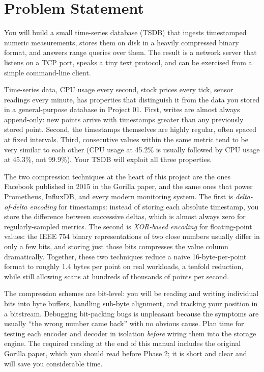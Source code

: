 \documentclass[11pt,a4paper]{article}
\begin{document}

\section{Problem Statement}

You will build a small time-series database (TSDB) that ingests timestamped numeric measurements, stores them on disk in a heavily compressed binary format, and answers range queries over them. The result is a network server that listens on a TCP port, speaks a tiny text protocol, and can be exercised from a simple command-line client.

Time-series data, CPU usage every second, stock prices every tick, sensor readings every minute, has properties that distinguish it from the data you stored in a general-purpose database in Project 01. First, writes are almost always append-only: new points arrive with timestamps greater than any previously stored point. Second, the timestamps themselves are highly regular, often spaced at fixed intervals. Third, consecutive values within the same metric tend to be very similar to each other (CPU usage at 45.2\% is usually followed by CPU usage at 45.3\%, not 99.9\%). Your TSDB will exploit all three properties.

The two compression techniques at the heart of this project are the ones Facebook published in 2015 in the Gorilla paper, and the same ones that power Prometheus, InfluxDB, and every modern monitoring system. The first is \textit{delta-of-delta encoding} for timestamps: instead of storing each absolute timestamp, you store the difference between successive deltas, which is almost always zero for regularly-sampled metrics. The second is \textit{XOR-based encoding} for floating-point values: the IEEE 754 binary representations of two close numbers usually differ in only a few bits, and storing just those bits compresses the value column dramatically. Together, these two techniques reduce a naive 16-byte-per-point format to roughly 1.4 bytes per point on real workloads, a tenfold reduction, while still allowing scans at hundreds of thousands of points per second.

The compression schemes are bit-level: you will be reading and writing individual bits into byte buffers, handling sub-byte alignment, and tracking your position in a bitstream. Debugging bit-packing bugs is unpleasant because the symptoms are usually ``the wrong number came back'' with no obvious cause. Plan time for testing each encoder and decoder in isolation \textit{before} wiring them into the storage engine. The required reading at the end of this manual includes the original Gorilla paper, which you should read before Phase 2; it is short and clear and will save you considerable time.
\end{document}
